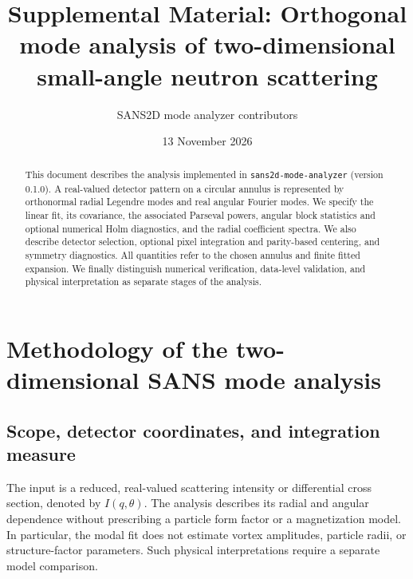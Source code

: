 \documentclass[aps,prb,preprint,onecolumn,notitlepage,amsmath,amssymb,
  superscriptaddress,floatfix]{revtex4-2}
\begin{document}
\raggedbottom

\title{Supplemental Material:
Orthogonal mode analysis of two-dimensional small-angle neutron scattering}
\author{SANS2D mode analyzer contributors}
\noaffiliation
\date{13 November 2026}

\begin{abstract}
This document describes the analysis implemented in
\texttt{sans2d-mode-analyzer} (version 0.1.0). A real-valued detector pattern
on a circular annulus is represented by orthonormal radial Legendre modes
and real angular Fourier modes. We specify the linear fit, its covariance,
the associated Parseval powers, angular block statistics and optional numerical
Holm diagnostics, and the radial coefficient spectra. We also describe detector selection, optional pixel
integration and parity-based centering, and symmetry diagnostics.
All quantities refer to the chosen annulus and finite fitted expansion. We
finally distinguish numerical verification, data-level validation, and
physical interpretation as separate stages of the analysis.
\end{abstract}

\maketitle

\tableofcontents
\clearpage

\section{Methodology of the two-dimensional SANS mode analysis}
\label{sec:methodology}

\subsection{Scope, detector coordinates, and integration measure}

The input is a reduced, real-valued scattering intensity or differential
cross section, denoted by $I(q,\theta)$. The analysis describes its radial
and angular dependence without prescribing a particle form factor or a
magnetization model. In particular, the modal fit does not estimate vortex
amplitudes, particle radii, or structure-factor parameters. Such physical
interpretations require a separate model comparison.
\end{document}
